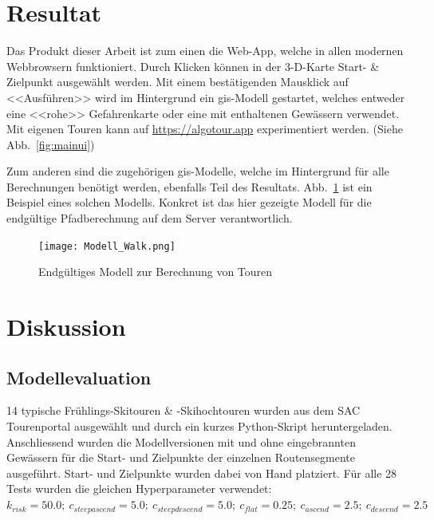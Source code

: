 \section{Resultat}

Das Produkt dieser Arbeit ist zum einen die Web-App, welche in allen modernen Webbrowsern funktioniert. Durch Klicken können in der 3-D-Karte Start- \& Zielpunkt ausgewählt werden. Mit einem bestätigenden Mausklick auf <<Ausführen>> wird im Hintergrund ein \gls{gis}-Modell gestartet, welches entweder eine <<rohe>> Gefahrenkarte oder eine mit enthaltenen Gewässern verwendet. Mit eigenen Touren kann auf \url{https://algotour.app} experimentiert werden. (Siehe Abb.\ \ref{fig:mainui})

Zum anderen sind die zugehörigen \acrshort{gis}-Modelle, welche im Hintergrund für alle Berechnungen benötigt werden, ebenfalls Teil des Resultats. Abb.\ \ref{fig:walkmodel} ist ein Beispiel eines solchen Modells. Konkret ist das hier gezeigte Modell für die endgültige Pfadberechnung auf dem Server verantwortlich.


\begin{figure}[H]
  \centering
  \texttt{[image: Modell\_Walk.png]}
  \caption{Endgültiges Modell zur Berechnung von Touren}\label{fig:walkmodel}
\end{figure}

\clearpage
\section{Diskussion}

\subsection{Modellevaluation}

14 typische Frühlings-Skitouren \& -Skihochtouren wurden aus dem SAC Tourenportal ausgewählt und durch ein kurzes Python-Skript heruntergeladen. Anschliessend wurden die Modellversionen mit und ohne eingebrannten Gewässern für die Start- und Zielpunkte der einzelnen Routensegmente ausgeführt. Start- und Zielpunkte wurden dabei von Hand platziert. Für alle 28 Tests wurden die gleichen Hyperparameter verwendet: $k_{risk}={50.0};\ c_{steepascend}={5.0};\ c_{steepdescend}={5.0};\ c_{flat}={0.25};\ c_{ascend}={2.5};\ c_{descend}={2.5}$

